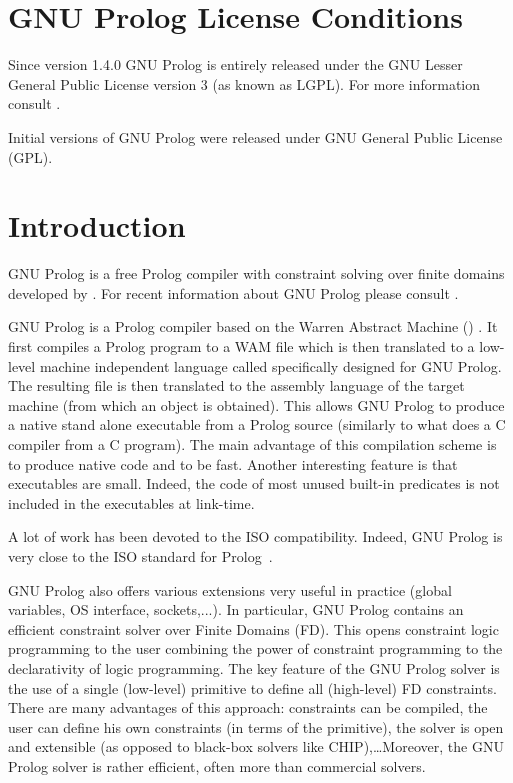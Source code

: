 \newpage
\section{GNU Prolog License Conditions}

Since version 1.4.0 GNU Prolog is entirely released under the GNU Lesser
General Public License version 3 (as known as LGPL). For more information
consult .

Initial versions of GNU Prolog were released under GNU General Public License
(GPL).
\section{Introduction}

GNU Prolog \cite{gnu-prolog} is a free Prolog compiler with constraint
solving over finite domains developed by
.  For recent
information about GNU Prolog please consult
.

 GNU Prolog is a Prolog compiler
based on the Warren Abstract Machine () \cite{Warren83,Ait-Kaci91}.
It first compiles a Prolog program to a WAM file which is then translated to
a low-level machine independent language called 
specifically designed for GNU Prolog. The resulting file is then translated
to the assembly language of the target machine (from which an object is
obtained). This allows GNU Prolog to produce a native stand alone executable
from a Prolog source (similarly to what does a C compiler from a C program).
The main advantage of this compilation scheme is to produce native code and
to be fast. Another interesting feature is that executables are small.
Indeed, the code of most unused built-in predicates is not included in the
executables at link-time.

A lot of work has been devoted to the ISO compatibility. Indeed, GNU Prolog
is very close to the ISO standard for Prolog~\cite{iso-part1}.

GNU Prolog also offers various extensions very useful in practice (global
variables, OS interface, sockets,...). In particular, GNU Prolog contains an
efficient constraint solver over Finite Domains (FD). This opens constraint
logic programming to the user combining the power of constraint programming to
the declarativity of logic programming. The key feature of the GNU Prolog
solver is the use of a single (low-level) primitive to define all
(high-level) FD constraints. There are many advantages of this approach:
constraints can be compiled, the user can define his own constraints (in
terms of the primitive), the solver is open and extensible (as opposed to
black-box solvers like CHIP),\ldots Moreover, the GNU Prolog solver is rather
efficient, often more than commercial solvers.

